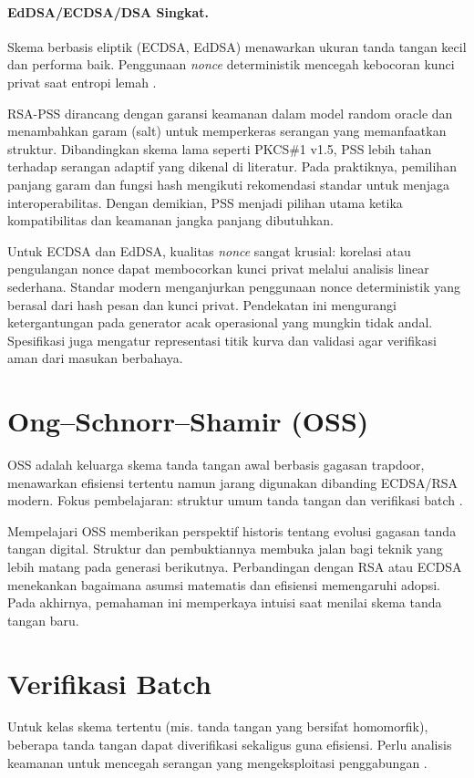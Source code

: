 \documentclass[../main.tex]{subfiles}
\begin{document}
\paragraph{EdDSA/ECDSA/DSA Singkat.} Skema berbasis eliptik (ECDSA, EdDSA) menawarkan ukuran tanda tangan kecil dan performa baik. Penggunaan \emph{nonce} deterministik mencegah kebocoran kunci privat saat entropi lemah \citep{rfc6979,rfc8032,fips186-5}.

RSA-PSS dirancang dengan garansi keamanan dalam model random oracle dan menambahkan garam (salt) untuk memperkeras serangan yang memanfaatkan struktur. Dibandingkan skema lama seperti PKCS\#1 v1.5, PSS lebih tahan terhadap serangan adaptif yang dikenal di literatur. Pada praktiknya, pemilihan panjang garam dan fungsi hash mengikuti rekomendasi standar untuk menjaga interoperabilitas. Dengan demikian, PSS menjadi pilihan utama ketika kompatibilitas dan keamanan jangka panjang dibutuhkan.

Untuk ECDSA dan EdDSA, kualitas \emph{nonce} sangat krusial: korelasi atau pengulangan nonce dapat membocorkan kunci privat melalui analisis linear sederhana. Standar modern menganjurkan penggunaan nonce deterministik yang berasal dari hash pesan dan kunci privat. Pendekatan ini mengurangi ketergantungan pada generator acak operasional yang mungkin tidak andal. Spesifikasi juga mengatur representasi titik kurva dan validasi agar verifikasi aman dari masukan berbahaya.

\section{Ong--Schnorr--Shamir (OSS)}
OSS adalah keluarga skema tanda tangan awal berbasis gagasan trapdoor, menawarkan efisiensi tertentu namun jarang digunakan dibanding ECDSA/RSA modern. Fokus pembelajaran: struktur umum tanda tangan dan verifikasi batch \citep{stallings}.

Mempelajari OSS memberikan perspektif historis tentang evolusi gagasan tanda tangan digital. Struktur dan pembuktiannya membuka jalan bagi teknik yang lebih matang pada generasi berikutnya. Perbandingan dengan RSA atau ECDSA menekankan bagaimana asumsi matematis dan efisiensi memengaruhi adopsi. Pada akhirnya, pemahaman ini memperkaya intuisi saat menilai skema tanda tangan baru.

\section{Verifikasi Batch}
Untuk kelas skema tertentu (mis. tanda tangan yang bersifat homomorfik), beberapa tanda tangan dapat diverifikasi sekaligus guna efisiensi. Perlu analisis keamanan untuk mencegah serangan yang mengeksploitasi penggabungan \citep{katzlindell}.
\end{document}
